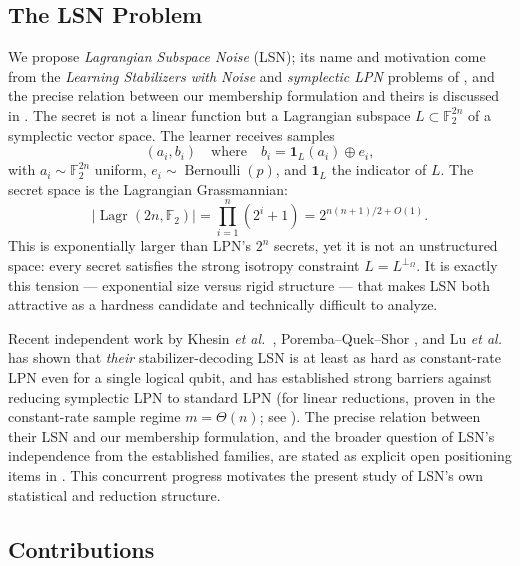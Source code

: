 \documentclass[11pt,a4paper]{article}
\theoremstyle{plain}
\theoremstyle{definition}
\newcommand{\F}{\mathbb{F}}
\DeclareMathOperator{\Lagr}{Lagr}
\newcommand{\etal}{\textit{et al.}}
\begin{document}
\subsection{The LSN Problem}
\label{subsec:lsn}

We propose \emph{Lagrangian Subspace Noise} (LSN); its name and motivation come from the \emph{Learning Stabilizers with Noise} and \emph{symplectic LPN} problems of \cite{KLP+25,LPQR26}, and the precise relation between our membership formulation and theirs is discussed in . The secret is not a linear function but a Lagrangian subspace $L \subset \F_2^{2n}$ of a symplectic vector space. The learner receives samples
\[
(a_i, b_i) \quad \text{where} \quad b_i = \mathbf{1}_L(a_i) \oplus e_i,
\]
with $a_i \sim \F_2^{2n}$ uniform, $e_i \sim \operatorname{Bernoulli}(p)$, and $\mathbf{1}_L$ the indicator of $L$. The secret space is the Lagrangian Grassmannian:
\begin{equation}
\label{eq:lagr-count}
|\Lagr(2n, \F_2)| = \prod_{i=1}^n (2^i + 1) = 2^{n(n+1)/2 + O(1)}.
\end{equation}
This is exponentially larger than LPN's $2^n$ secrets, yet it is not an unstructured space: every secret satisfies the strong isotropy constraint $L = L^{\perp_\Omega}$. It is exactly this tension --- exponential size versus rigid structure --- that makes LSN both attractive as a hardness candidate and technically difficult to analyze.

Recent independent work by Khesin \etal\ \cite{KLP+25}, Poremba--Quek--Shor \cite{PQS26}, and Lu \etal\ \cite{LPQR26} has shown that \emph{their} stabilizer-decoding LSN is at least as hard as constant-rate LPN even for a single logical qubit, and has established strong barriers against reducing symplectic LPN to standard LPN (for linear reductions, proven in the constant-rate sample regime $m=\Theta(n)$; see ). The precise relation between their LSN and our membership formulation, and the broader question of LSN's independence from the established families, are stated as explicit open positioning items in . This concurrent progress motivates the present study of LSN's own statistical and reduction structure.

\subsection{Contributions}
\label{subsec:contributions}
\end{document}
